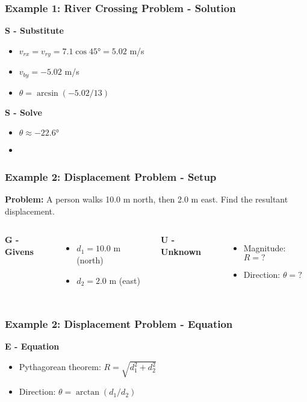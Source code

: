 \documentclass{beamer}
\begin{document}
\begin{frame}
\frametitle{Example 1: River Crossing Problem - Solution}
\textbf{S - Substitute}
\begin{itemize}
\item $v_{rx} = v_{ry} = 7.1\cos 45° = 5.02$ m/s \pause
\item $v_{by} = -5.02$ m/s \pause
\item $\theta = \arcsin(-5.02/13)$
\end{itemize}
\pause

\textbf{S - Solve}
\begin{itemize}
\item $\theta \approx -22.6°$
\item {}
\end{itemize}
\end{frame}

\begin{frame}
\frametitle{Example 2: Displacement Problem - Setup}
\textbf{Problem:} A person walks 10.0 m north, then 2.0 m east. Find the resultant displacement.
\pause
\vspace{0.3cm}

\begin{columns}[T]
\textbf{G - Givens}
\begin{itemize}
\item $d_1 = 10.0$ m (north)
\item $d_2 = 2.0$ m (east)
\end{itemize}

\textbf{U - Unknown}
\begin{itemize}
\item Magnitude: $R = ?$
\item Direction: $\theta = ?$
\end{itemize}
\end{columns}
\end{frame}

\begin{frame}
\frametitle{Example 2: Displacement Problem - Equation}
\textbf{E - Equation}
\begin{itemize}
\item Pythagorean theorem: $R = \sqrt{d_1^2 + d_2^2}$ \pause
\item Direction: $\theta = \arctan(d_1/d_2)$
\end{itemize}
\end{frame}
\end{document}
